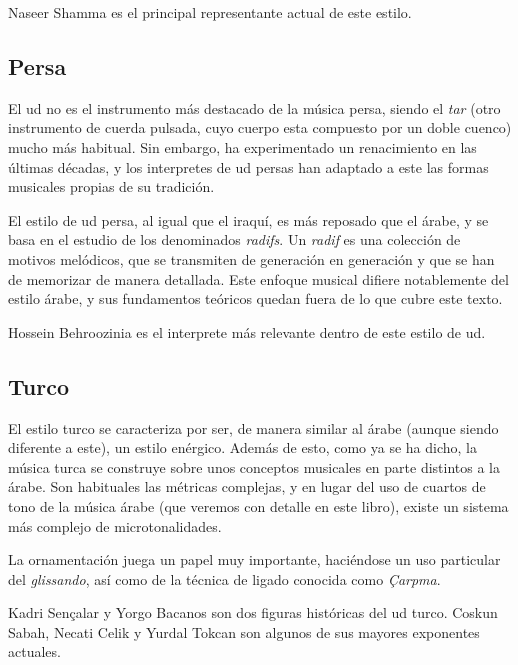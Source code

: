 Naseer Shamma es el principal representante actual de este estilo.


\subsection{Persa}

El ud no es el instrumento más destacado de la música persa, siendo el \emph{tar} (otro instrumento de cuerda pulsada, cuyo cuerpo esta compuesto por un doble cuenco) mucho más habitual. Sin embargo, ha experimentado un renacimiento en las últimas décadas, y los interpretes de ud persas han adaptado a este las formas musicales propias de su tradición.

El estilo de ud persa, al igual que el iraquí, es más reposado que el árabe, y se basa en el estudio de los denominados \emph{radifs}. Un \emph{radif} es una colección de motivos melódicos, que se transmiten de generación en generación y que se han de memorizar de manera detallada. Este enfoque musical difiere notablemente del estilo árabe, y sus fundamentos teóricos quedan fuera de lo que cubre este texto.

Hossein Behroozinia es el interprete más relevante dentro de este estilo de ud.


\subsection{Turco}

El estilo turco se caracteriza por ser, de manera similar al árabe (aunque siendo diferente a este), un estilo enérgico. Además de esto, como ya se ha dicho, la música turca se construye sobre unos conceptos musicales en parte distintos a la árabe. Son habituales las métricas complejas, y en lugar del uso de cuartos de tono de la música árabe (que veremos con detalle en este libro), existe un sistema más complejo de microtonalidades.

La ornamentación juega un papel muy importante, haciéndose un uso particular del \emph{glissando}, así como de la técnica de ligado conocida como \emph{Çarpma}.

Kadri Sençalar y Yorgo Bacanos son dos figuras históricas del ud turco. Coskun Sabah, Necati Celik y Yurdal Tokcan son algunos de sus mayores exponentes actuales.

